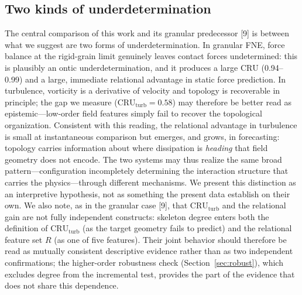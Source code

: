 \documentclass[11pt,a4paper]{article}
\begin{document}
\subsection{Two kinds of underdetermination}
The central comparison of this work and its granular predecessor [9] is between what we suggest are two forms of underdetermination. In granular FNE, force balance at the rigid-grain limit genuinely leaves contact forces undetermined: this is plausibly an ontic underdetermination, and it produces a large $\mathrm{CRU}$ (0.94--0.99) and a large, immediate relational advantage in static force prediction. In turbulence, vorticity is a derivative of velocity and topology is recoverable in principle; the gap we measure ($\mathrm{CRU}_{\text{turb}} = 0.58$) may therefore be better read as epistemic---low-order field features simply fail to recover the topological organization. Consistent with this reading, the relational advantage in turbulence is small at instantaneous comparison but emerges, and grows, in forecasting: topology carries information about where dissipation is \emph{heading} that field geometry does not encode. The two systems may thus realize the same broad pattern---configuration incompletely determining the interaction structure that carries the physics---through different mechanisms. We present this distinction as an interpretive hypothesis, not as something the present data establish on their own. We also note, as in the granular case [9], that $\mathrm{CRU}_{\text{turb}}$ and the relational gain are not fully independent constructs: skeleton degree enters both the definition of $\mathrm{CRU}_{\text{turb}}$ (as the target geometry fails to predict) and the relational feature set $R$ (as one of five features). Their joint behavior should therefore be read as mutually consistent descriptive evidence rather than as two independent confirmations; the higher-order robustness check (Section~\ref{sec:robust}), which excludes degree from the incremental test, provides the part of the evidence that does not share this dependence.
\end{document}
